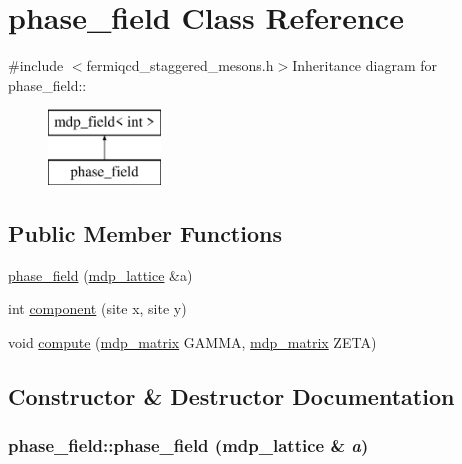 \hypertarget{classphase__field}{
\section{phase\_\-field Class Reference}
\label{classphase__field}
}


{\ttfamily \#include $<$fermiqcd\_\-staggered\_\-mesons.h$>$}Inheritance diagram for phase\_\-field::\begin{figure}[H]
\begin{center}
\leavevmode
\includegraphics[height=2cm]{classphase__field}
\end{center}
\end{figure}
\subsection*{Public Member Functions}
\begin{DoxyCompactItemize}
\item 
\hyperlink{classphase__field_ad57c78000dce7ec4316117b5a1451c1f}{phase\_\-field} (\hyperlink{classmdp__lattice}{mdp\_\-lattice} \&a)
\item 
int \hyperlink{classphase__field_aa4837d1dbdef924550e2c473b8cb7cd0}{component} (site x, site y)
\item 
void \hyperlink{classphase__field_a00ef00d8126c1ce8d68b53d67d217902}{compute} (\hyperlink{classmdp__matrix}{mdp\_\-matrix} GAMMA, \hyperlink{classmdp__matrix}{mdp\_\-matrix} ZETA)
\end{DoxyCompactItemize}


\subsection{Constructor \& Destructor Documentation}
\hypertarget{classphase__field_ad57c78000dce7ec4316117b5a1451c1f}{
\subsubsection[{phase\_\-field}]{\setlength{\rightskip}{0pt plus 5cm}phase\_\-field::phase\_\-field ({\bf mdp\_\-lattice} \& {\em a})}}
\label{classphase__field_ad57c78000dce7ec4316117b5a1451c1f}


